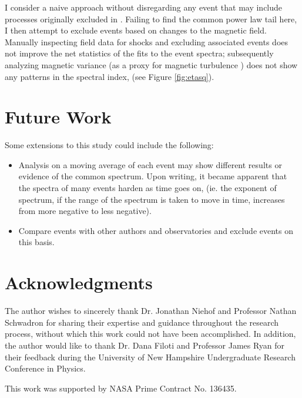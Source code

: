 \documentclass[letterpaper,11pt]{article}
\begin{document}
I consider a naive approach without disregarding any event that may include processes originally excluded in \citet{Fisk2006}.  Failing to find the common power law tail here, I then attempt to exclude events based on changes to the magnetic field.  Manually inspecting field data for shocks and excluding associated events does not improve the net statistics of the fits to the event spectra; subsequently analyzing magnetic variance (as a proxy for magnetic turbulence \citep{Schwadron1996}) does not show any patterns in the spectral index, (see Figure \ref{fig:etasq}).



\section{Future Work}
\label{sec:future}
Some extensions to this study could include the following:

\begin{itemize}
\item Analysis on a moving average of each event may show different results or evidence of the common spectrum.  Upon writing, it became apparent that the spectra of many events harden as time goes on, (ie. the exponent of spectrum, if the range of the spectrum is taken to move in time, increases from more negative to less negative).
\item Compare events with other authors and observatories and exclude events on this basis.
\end{itemize}



\section{Acknowledgments}
The author wishes to sincerely thank Dr. Jonathan Niehof and Professor Nathan Schwadron for sharing their expertise and guidance throughout the research process, without which this work could not have been accomplished. In addition, the author would like to thank Dr. Dana Filoti and Professor James Ryan for their feedback during the University of New Hampshire Undergraduate Research Conference in Physics.

\bigskip

\noindent This work was supported by NASA Prime Contract No. 136435.




%
%

\end{document}
